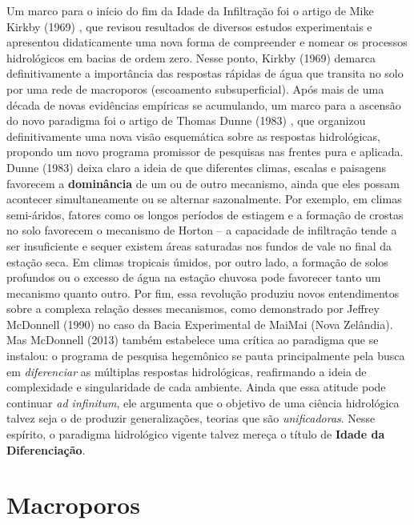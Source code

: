 \documentclass[./main.tex]{subfiles}
\begin{document}
\par Um marco para o início do fim da Idade da Infiltração foi o artigo de Mike Kirkby (1969) \cite{Kirkby1969}, que revisou resultados de diversos estudos experimentais e apresentou didaticamente uma nova forma de compreender e nomear os processos hidrológicos em bacias de ordem zero. Nesse ponto, Kirkby (1969) demarca definitivamente a importância das respostas rápidas de água que transita no solo por uma rede de macroporos (escoamento subsuperficial). Após mais de uma década de novas evidências empíricas se acumulando, um marco para a ascensão do novo paradigma foi o artigo de Thomas Dunne (1983) \cite{Dunne1983}, que organizou definitivamente uma nova visão esquemática sobre as respostas hidrológicas, propondo um novo programa promissor de pesquisas nas frentes pura e aplicada. Dunne (1983) deixa claro a ideia de que diferentes climas, escalas e paisagens favorecem a \textbf{dominância} de um ou de outro mecanismo, ainda que eles possam acontecer simultaneamente ou se alternar sazonalmente. Por exemplo, em climas semi-áridos, fatores como os longos períodos de estiagem e a formação de crostas no solo favorecem o mecanismo de Horton -- a capacidade de infiltração tende a ser insuficiente e sequer existem áreas saturadas nos fundos de vale no final da estação seca. Em climas tropicais úmidos, por outro lado, a formação de solos profundos ou o excesso de água na estação chuvosa pode favorecer tanto um mecanismo quanto outro. Por fim, essa revolução produziu novos entendimentos sobre a complexa relação desses mecanismos, como demonstrado por Jeffrey McDonnell (1990) \cite{mcdonnell1990} no caso da Bacia Experimental de MaiMai (Nova Zelândia). Mas McDonnell (2013) \cite{Mcdonnell2013} também estabelece uma crítica ao paradigma que se instalou: o programa de pesquisa hegemônico se pauta principalmente pela busca em \textit{diferenciar} as múltiplas respostas hidrológicas, reafirmando a ideia de complexidade e singularidade de cada ambiente. Ainda que essa atitude pode continuar \textit{ad infinitum}, ele argumenta que o objetivo de uma ciência hidrológica talvez seja o de produzir generalizações, teorias que são \textit{unificadoras}. Nesse espírito, o paradigma hidrológico vigente talvez mereça o título de \textbf{Idade da Diferenciação}.

\section{Macroporos}

\end{document}
